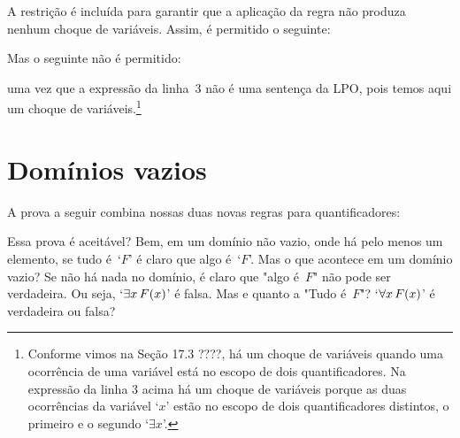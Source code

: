 A restrição é incluída para garantir que a aplicação da regra não produza nenhum choque de variáveis. Assim, é permitido o seguinte:

\begin{fitchproof}
	 
	 
\end{fitchproof}
Mas o seguinte  não é permitido:
\begin{fitchproof}
	 
\end{fitchproof}
uma vez que a expressão da linha~3 não é uma sentença da LPO, pois 
temos aqui um choque de variáveis.\footnote{Conforme vimos na Seção 17.3 ????, há um choque de variáveis quando uma ocorrência de uma variável está no escopo de dois quantificadores. Na expressão da linha 3 acima há um choque de variáveis porque as duas ocorrências da variável `$x$' estão no escopo de dois quantificadores distintos, o primeiro e o segundo `$\exists x$'.}

\section{Domínios vazios}
A prova a seguir combina nossas duas novas regras para quantificadores:
	\begin{fitchproof}
	\end{fitchproof}

Essa prova é aceitável? Bem, em um domínio não vazio, onde há pelo menos um elemento, se tudo é~`$F$'  é claro que algo é~`$F$'. Mas o que acontece em um domínio vazio? Se não há nada no domínio, é claro que "algo é~$F$" não pode ser verdadeira. Ou seja, `$\exists x\,\mathord{F}(x)$' é falsa. Mas e quanto a "Tudo é~$F$"?  `$\forall x\,\mathord{F}(x)$' é verdadeira ou falsa?

